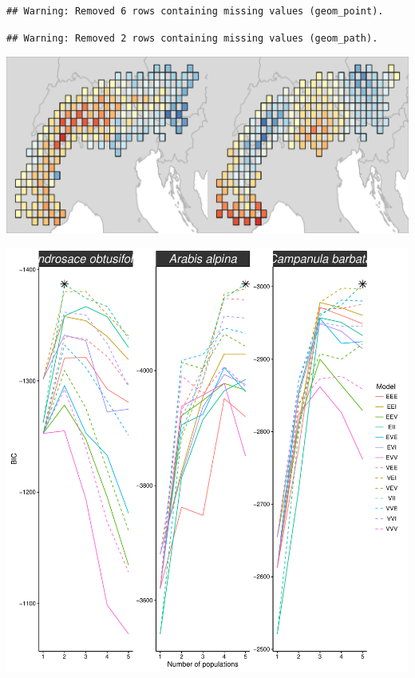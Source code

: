 \documentclass[11pt,]{article}
\let\origfigure\figure
\let\endorigfigure\endfigure
\renewenvironment{figure}[1][2] {
	\expandafter\origfigure\expandafter[H]
} {
	\endorigfigure
}
\begin{document}
\begin{verbatim}
## Warning: Removed 6 rows containing missing values (geom_point).
\end{verbatim}

\begin{verbatim}
## Warning: Removed 2 rows containing missing values (geom_path).
\end{verbatim}

\begin{figure}[htbp]
\centering
\includegraphics{supporting_information_files/figure-latex/unnamed-chunk-5-1.pdf}
\caption{Relative support ($\Delta$K) for the number of populations in
each species. Each panel denotes a different species. The number of
populations with the highest $Delta$K value is has the most support.}
\end{figure}

\begin{figure}[htbp]
\centering
\includegraphics{supporting_information_files/figure-latex/unnamed-chunk-6-1.pdf}
\caption{Population membership plots. Each panel depicts a different
species. Each vertical bar represents a different individual. The colors
in each bar denote the probability that the individual belongs to
different populations.}
\end{figure}
\end{document}
